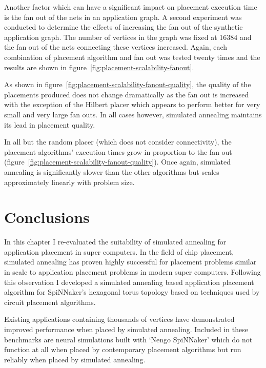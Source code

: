 				Another factor which can have a significant impact on placement
				execution time is the fan out of the nets in an application graph. A
				second experiment was conducted to determine the effects of increasing
				the fan out of the synthetic application graph. The number of vertices
				in the graph was fixed at \num{16384} and the fan out of the nets
				connecting these vertices increased. Again, each combination of
				placement algorithm and fan out was tested twenty times and the results
				are shown in figure~\ref{fig:placement-scalability-fanout}.
				
				As shown in figure~\ref{fig:placement-scalability-fanout-quality}, the
				quality of the placements produced does not change dramatically as the
				fan out is increased with the exception of the Hilbert placer which
				appears to perform better for very small and very large fan outs. In
				all cases however, simulated annealing maintains its lead in placement
				quality.
				
				In all but the random placer (which does not consider connectivity),
				the placement algorithms' execution times grow in proportion to the fan
				out (figure~\ref{fig:placement-scalability-fanout-quality}). Once
				again, simulated annealing is significantly slower than the other
				algorithms but scales approximately linearly with problem size.
	
	\section{Conclusions}
		
		In this chapter I re-evaluated the suitability of simulated annealing for
		application placement in super computers. In the field of chip placement,
		simulated annealing has proven highly successful for placement problems
		similar in scale to application placement problems in modern super
		computers. Following this observation I developed a simulated annealing
		based application placement algorithm for SpiNNaker's hexagonal torus
		topology based on techniques used by circuit placement algorithms.
		
		Existing applications containing thousands of vertices have demonstrated
		improved performance when placed by simulated annealing. Included in these
		benchmarks are neural simulations built with `Nengo SpiNNaker' which do not
		function at all when placed by contemporary placement algorithms but run
		reliably when placed by simulated annealing.
		
